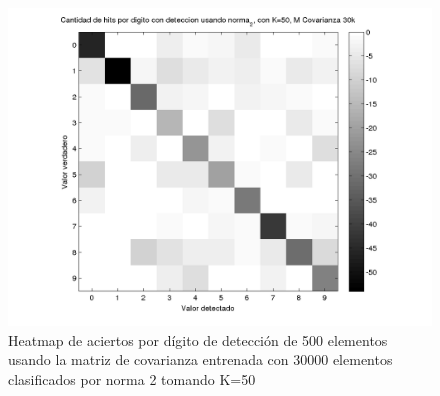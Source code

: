 \begin{figure}[H]
\includegraphics[width=\hmwidth]{plots/heatmap-30kcv-k50-norma_2.png}
\caption{Heatmap de aciertos por d\'igito de detecci\'on de 500 elementos usando la matriz de covarianza entrenada con 30000 elementos
clasificados por norma 2 tomando K=50 }
\label{fig:HM30kcv-k50}
\end{figure}

